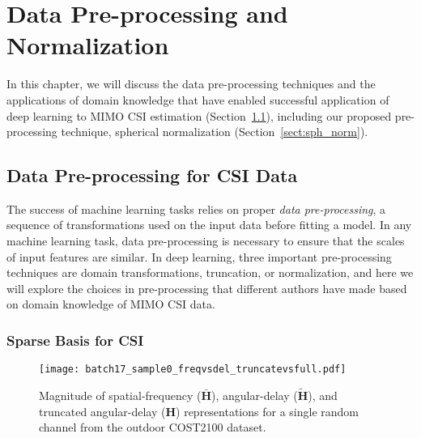 \chapter{Data Pre-processing and Normalization}
\label{chap:sph_norm}

In this chapter, we will discuss the data pre-processing techniques and the applications of domain knowledge that have enabled successful application of deep learning to MIMO CSI estimation (Section~\ref{sec:data-preprocessing}), including our proposed pre-processing technique, spherical normalization (Section~\ref{sect:sph_norm}). 


\section{Data Pre-processing for CSI Data} \label{sec:data-preprocessing}

The success of machine learning tasks relies on proper \emph{data pre-processing}, a sequence of transformations used on the input data before fitting a model. In any machine learning task, data pre-processing is necessary to ensure that the scales of input features are similar. In deep learning, three important pre-processing techniques are domain transformations, truncation, or normalization, and here we will explore the choices in pre-processing that different authors have made based on domain knowledge of MIMO CSI data.

\subsection{Sparse Basis for CSI} \label{sect:sparse-csi}

\begin{figure}[htb]
	\centering
	\texttt{[image: batch17\_sample0\_freqvsdel\_truncatevsfull.pdf]}
	\medskip
	\caption{Magnitude of spatial-frequency ($\bar{\mathbf H}$), angular-delay ($\tilde{\mathbf H}$), and truncated angular-delay ($\mathbf H$) representations for a single random channel from the outdoor COST2100 dataset.}
	\label{fig:freq-vs-delay}
\end{figure}

